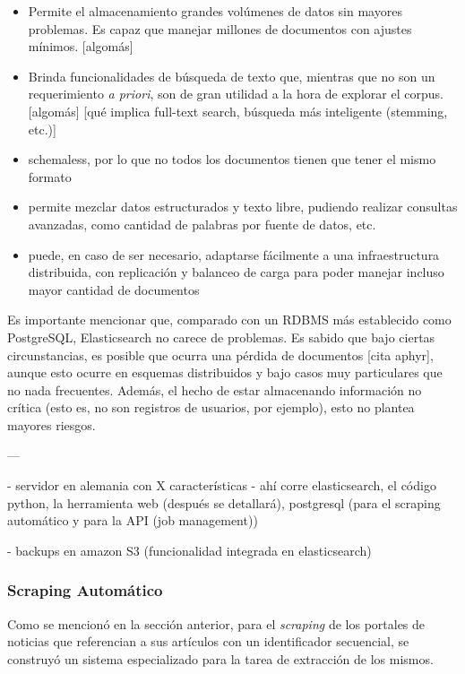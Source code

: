\begin{itemize}

\item Permite el almacenamiento grandes volúmenes de datos sin mayores problemas. Es capaz que
manejar millones de documentos con ajustes mínimos. [algomás]

\item Brinda funcionalidades de búsqueda de texto que, mientras que no son un requerimiento
\textit{a priori}, son de gran utilidad a la hora de explorar el corpus. [algomás] [qué implica
full-text search, búsqueda más inteligente (stemming, etc.)]

\item schemaless, por lo que no todos los documentos tienen que tener el mismo formato

\item permite mezclar datos estructurados y texto libre, pudiendo realizar consultas avanzadas, como
cantidad de palabras por fuente de datos, etc.

\item puede, en caso de ser necesario, adaptarse fácilmente a una infraestructura distribuida, con
replicación y balanceo de carga para poder manejar incluso mayor cantidad de documentos

\end{itemize}

Es importante mencionar que, comparado con un RDBMS más establecido como PostgreSQL, Elasticsearch
no carece de problemas. Es sabido que bajo ciertas circunstancias, es posible que ocurra una pérdida
de documentos [cita aphyr], aunque esto ocurre en esquemas distribuidos y bajo casos muy
particulares que no nada frecuentes. Además, el hecho de estar almacenando información no crítica
(esto es, no son registros de usuarios, por ejemplo), esto no plantea mayores riesgos.

---

- servidor en alemania con X características
- ahí corre elasticsearch, el código python, la herramienta web (después se detallará),
  postgresql (para el scraping automático y para la API (job management))

- backups en amazon S3 (funcionalidad integrada en elasticsearch)


\subsubsection{Scraping Automático}

Como se mencionó en la sección anterior, para el \textit{scraping} de los portales de noticias que
referencian a sus artículos con un identificador secuencial, se construyó un sistema especializado
para la tarea de extracción de los mismos.

